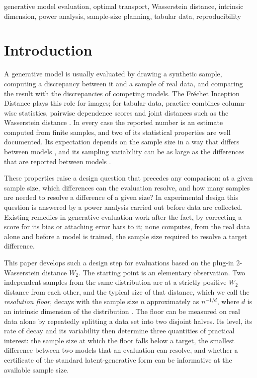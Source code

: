 \documentclass[twoside,11pt]{article}
\theoremstyle{plain}
\theoremstyle{definition}
\theoremstyle{remark}
\newcommand{\Wtwo}{\ensuremath{W_2}}
\begin{document}
\begin{keywords}
generative model evaluation, optimal transport, Wasserstein distance,
intrinsic dimension, power analysis, sample-size planning, tabular data,
reproducibility
\end{keywords}

\section{Introduction}\label{sec:intro}

A generative model is usually evaluated by drawing a synthetic sample,
computing a discrepancy between it and a sample of real data, and comparing
the result with the discrepancies of competing models. The Fr\'echet
Inception Distance \citep{heusel2017} plays this role for images; for
tabular data, practice combines column-wise statistics, pairwise
dependence scores and joint distances such as the Wasserstein distance
\citep{patki2016,yang2024}. In every case the reported number is an estimate
computed from finite samples, and two of its statistical properties are well
documented. Its expectation depends on the sample size in a way that differs
between models \citep{chong2020}, and its sampling variability can be as
large as the differences that are reported between models
\citep{card2020,bouthillier2021}.

These properties raise a design question that precedes any comparison: at a
given sample size, which differences can the evaluation resolve, and how
many samples are needed to resolve a difference of a given size? In
experimental design this question is answered by a power analysis carried
out before data are collected. Existing remedies in generative evaluation
work after the fact, by correcting a score for its bias or attaching error
bars to it; none computes, from the real data alone and before a model is
trained, the sample size required to resolve a target difference.

This paper develops such a design step for evaluations based on the plug-in
2-Wasserstein distance $\Wtwo$. The starting point is an elementary
observation. Two independent samples from the same distribution are at a
strictly positive $\Wtwo$ distance from each other, and the typical size of that distance, which we call the \emph{resolution floor}, decays with the sample size $n$ approximately as $n^{-1/d}$, where $d$ is an intrinsic
dimension of the distribution \citep{weedbach2019}. The floor can be
measured on real data alone by repeatedly splitting a data set into two
disjoint halves. Its level, its rate of decay and its variability then
determine three quantities of practical interest: the sample size at which
the floor falls below a target, the smallest difference between two models
that an evaluation can resolve, and whether a certificate of the standard
latent-generative form can be informative at the available sample size.
\end{document}
